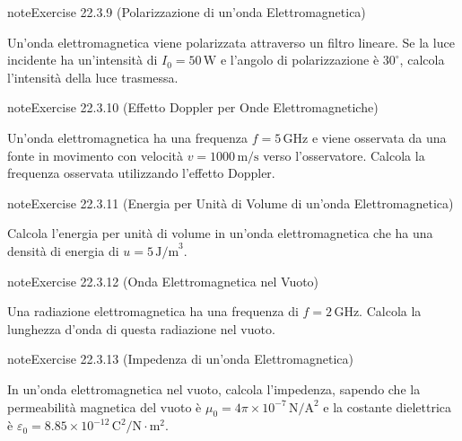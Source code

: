 \documentclass[letterpaper,10pt,italian]{jupyterBook}
\begin{document}
\begin{sphinxadmonition}{note}{Exercise 22.3.9 (Polarizzazione di un’onda Elettromagnetica)}



\sphinxAtStartPar
Un’onda elettromagnetica viene polarizzata attraverso un filtro lineare. Se la luce incidente ha un’intensità di \(I_0 = 50 \, \text{W}\) e l’angolo di polarizzazione è \(30^\circ\), calcola l’intensità della luce trasmessa.
\end{sphinxadmonition}
 \label{exercise:ch/electromagnetism/em-waves-problems-exercise-9}

\begin{sphinxadmonition}{note}{Exercise 22.3.10 (Effetto Doppler per Onde Elettromagnetiche)}



\sphinxAtStartPar
Un’onda elettromagnetica ha una frequenza \(f = 5 \, \text{GHz}\) e viene osservata da una fonte in movimento con velocità \(v = 1000 \, \text{m/s}\) verso l’osservatore. Calcola la frequenza osservata utilizzando l’effetto Doppler.
\end{sphinxadmonition}
 \label{exercise:ch/electromagnetism/em-waves-problems-exercise-10}

\begin{sphinxadmonition}{note}{Exercise 22.3.11 (Energia per Unità di Volume di un’onda Elettromagnetica)}



\sphinxAtStartPar
Calcola l’energia per unità di volume in un’onda elettromagnetica che ha una densità di energia di \(u = 5 \, \text{J/m}^3\).
\end{sphinxadmonition}
 \label{exercise:ch/electromagnetism/em-waves-problems-exercise-11}

\begin{sphinxadmonition}{note}{Exercise 22.3.12 (Onda Elettromagnetica nel Vuoto)}



\sphinxAtStartPar
Una radiazione elettromagnetica ha una frequenza di \(f = 2 \, \text{GHz}\). Calcola la lunghezza d’onda di questa radiazione nel vuoto.
\end{sphinxadmonition}
 \label{exercise:ch/electromagnetism/em-waves-problems-exercise-12}

\begin{sphinxadmonition}{note}{Exercise 22.3.13 (Impedenza di un’onda Elettromagnetica)}



\sphinxAtStartPar
In un’onda elettromagnetica nel vuoto, calcola l’impedenza, sapendo che la permeabilità magnetica del vuoto è \(\mu_0 = 4\pi \times 10^{-7} \, \text{N}/\text{A}^2\) e la costante dielettrica è \(\varepsilon_0 = 8.85 \times 10^{-12} \, \text{C}^2/\text{N} \cdot \text{m}^2\).
\end{sphinxadmonition}
 \label{exercise:ch/electromagnetism/em-waves-problems-exercise-13}
\end{document}
